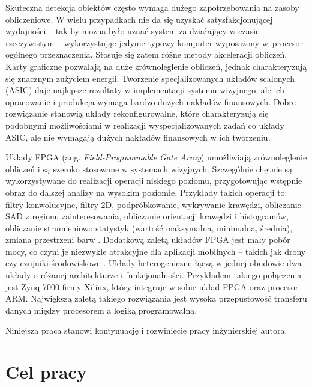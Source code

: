 Skuteczna detekcja obiektów często wymaga dużego zapotrzebowania na zasoby obliczeniowe. 
W wielu przypadkach nie da się uzyskać satysfakcjonującej wydajności -- tak by można było uznać system za działający w czasie rzeczywistym -- wykorzystując jedynie typowy komputer wyposażony w~procesor ogólnego przeznaczenia. 
Stosuje się zatem różne metody akceleracji obliczeń. 
Karty graficzne pozwalają na duże zrównoleglenie obliczeń, jednak charakteryzują się znacznym zużyciem energii. %
Tworzenie specjalizowanych układów scalonych (ASIC) daje najlepsze rezultaty w implementacji systemu wizyjnego, ale ich opracowanie i produkcja wymaga bardzo dużych nakładów finansowych. %
Dobre rozwiązanie stanowią układy rekonfigurowalne, które charakteryzują się podobnymi możliwościami w realizacji wyspecjalizowanych zadań co układy ASIC, ale nie wymagają dużych nakładów finansowych w ich tworzeniu. %

Układy FPGA (ang. \textit{Field-Programmable Gate Array}) umożliwiają zrównoleglenie obliczeń i są szeroko stosowane w systemach wizyjnych. 
Szczególnie chętnie są wykorzystywane do realizacji operacji niskiego poziomu, przygotowując wstępnie obraz do dalszej analizy na wysokim poziomie. 
Przykłady takich operacji to: filtry konwolucyjne, filtry 2D, podpróbkowanie, wykrywanie krawędzi, obliczanie SAD z regionu zainteresowania, obliczanie orientacji krawędzi i histogramów, obliczanie strumieniowo statystyk (wartość maksymalna, minimalna, średnia), zmiana przestrzeni barw \cite{ kisacanin2008embedded}. %
Dodatkową zaletą układów FPGA jest mały pobór mocy, co czyni je niezwykle atrakcyjne dla aplikacji mobilnych -- takich jak drony czy czujniki środowiskowe \cite{garcia2014survey}. 
Układy heterogeniczne łączą w jednej obudowie dwa układy o różanej architekturze i funkcjonalności. 
Przykładem takiego połączenia jest Zynq-7000 firmy Xilinx, który integruje w sobie układ FPGA oraz procesor ARM. 
Największą zaletą takiego rozwiązania jest wysoka przepustowość transferu danych między procesorem a logiką programowalną. 

Niniejsza praca stanowi kontynuację i rozwinięcie pracy inżynierskiej autora.

\section{Cel pracy}

